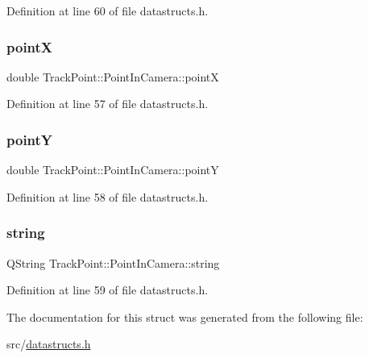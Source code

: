 Definition at line 60 of file datastructs.\+h.

\mbox{\label{struct_track_point_1_1_point_in_camera_a1b25bead4de7a834679d95426378774f}} 
\subsubsection{\texorpdfstring{pointX}{pointX}}
{\footnotesize\ttfamily double Track\+Point\+::\+Point\+In\+Camera\+::pointX}



Definition at line 57 of file datastructs.\+h.

\mbox{\label{struct_track_point_1_1_point_in_camera_ad761e88d291aefd02f737511e3c3cd19}} 
\subsubsection{\texorpdfstring{pointY}{pointY}}
{\footnotesize\ttfamily double Track\+Point\+::\+Point\+In\+Camera\+::pointY}



Definition at line 58 of file datastructs.\+h.

\mbox{\label{struct_track_point_1_1_point_in_camera_ae1c5c53619d9800329288dd6996527ca}} 
\subsubsection{\texorpdfstring{string}{string}}
{\footnotesize\ttfamily Q\+String Track\+Point\+::\+Point\+In\+Camera\+::string}



Definition at line 59 of file datastructs.\+h.



The documentation for this struct was generated from the following file\+:\begin{DoxyCompactItemize}
\item 
src/\mbox{\hyperlink{datastructs_8h}{datastructs.\+h}}\end{DoxyCompactItemize}
